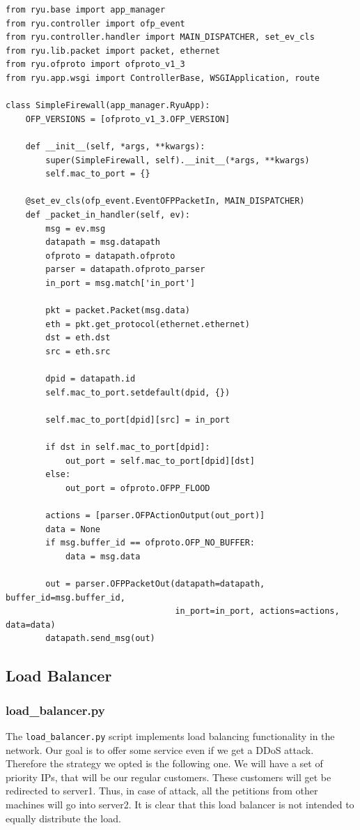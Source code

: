 \documentclass[a4paper,12pt]{article}
\begin{document}
\begin{verbatim}
from ryu.base import app_manager
from ryu.controller import ofp_event
from ryu.controller.handler import MAIN_DISPATCHER, set_ev_cls
from ryu.lib.packet import packet, ethernet
from ryu.ofproto import ofproto_v1_3
from ryu.app.wsgi import ControllerBase, WSGIApplication, route

class SimpleFirewall(app_manager.RyuApp):
    OFP_VERSIONS = [ofproto_v1_3.OFP_VERSION]

    def __init__(self, *args, **kwargs):
        super(SimpleFirewall, self).__init__(*args, **kwargs)
        self.mac_to_port = {}

    @set_ev_cls(ofp_event.EventOFPPacketIn, MAIN_DISPATCHER)
    def _packet_in_handler(self, ev):
        msg = ev.msg
        datapath = msg.datapath
        ofproto = datapath.ofproto
        parser = datapath.ofproto_parser
        in_port = msg.match['in_port']

        pkt = packet.Packet(msg.data)
        eth = pkt.get_protocol(ethernet.ethernet)
        dst = eth.dst
        src = eth.src

        dpid = datapath.id
        self.mac_to_port.setdefault(dpid, {})

        self.mac_to_port[dpid][src] = in_port

        if dst in self.mac_to_port[dpid]:
            out_port = self.mac_to_port[dpid][dst]
        else:
            out_port = ofproto.OFPP_FLOOD

        actions = [parser.OFPActionOutput(out_port)]
        data = None
        if msg.buffer_id == ofproto.OFP_NO_BUFFER:
            data = msg.data

        out = parser.OFPPacketOut(datapath=datapath, buffer_id=msg.buffer_id,
                                  in_port=in_port, actions=actions, data=data)
        datapath.send_msg(out)
\end{verbatim}

\subsection{Load Balancer}

\subsubsection{load\_balancer.py}
The \texttt{load\_balancer.py} script implements load balancing functionality in the network. Our goal is to offer some service even if we get a DDoS attack. Therefore the strategy we opted is the following one. 
We will have a set of priority IPs, that will be our regular customers. These customers will get be redirected to server1. Thus, in case of attack, all the petitions from other machines will go into server2. 
It is clear that this load balancer is not intended to equally distribute the load. 
\end{document}
